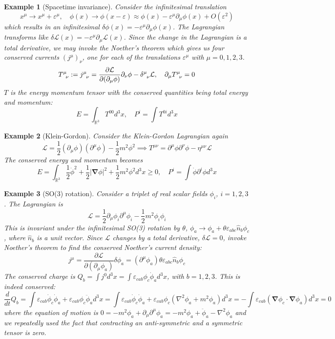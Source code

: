 \documentclass[a4paper]{article}
\newtheorem{eg}{Example}[section]
\theoremstyle{new}
\begin{document}
\begin{eg}[Spacetime invariance]
Consider the infinitesimal translation
$$x^\mu\rightarrow x^\mu+\varepsilon^\mu,\quad\phi(x)\rightarrow\phi(x-\varepsilon)\approx\phi(x)-\varepsilon^\mu\partial_\mu\phi(x)+O(\varepsilon^2)$$
which results in an infinitesimal $\delta\phi(x)=-\varepsilon^\mu\partial_\mu\phi(x)$. The Lagrangian transforms like $\delta\mathcal{L}(x)=-\varepsilon^\mu\partial_\mu\mathcal{L}(x)$. Since the change in the Lagrangian is a total derivative, we may invoke the Noether’s theorem which gives us four conserved currents $(j^\mu)_\nu$, one for each of the translations $\varepsilon^\mu$ with $\mu=0,1,2,3$.
$$\tensor*{T}{*_{}^{\mu}_{\nu}}:=\tensor*{j}{*_{}^{\mu}_{\nu}}=\frac{\partial\mathcal{L}}{\partial(\partial_\mu\phi)}\partial_\nu\phi-\tensor*{\delta}{*_{}^{\mu}_{\nu}}\mathcal{L},\quad\partial_\mu\tensor*{T}{*_{}^{\mu}_{\nu}}=0$$
$T$ is the energy momentum tensor with the conserved quantities being total energy and momentum:
$$E=\int_{\mathbb{R}^3}T^{00}d^3x,\quad P^i=\int T^{0i}d^3x$$
\end{eg}
\begin{eg}[Klein-Gordon]
Consider the Klein-Gordon Lagrangian again
$$\mathcal{L}=\frac{1}{2}(\partial_\mu\phi)(\partial^\mu\phi)-\frac{1}{2}m^2\phi^2\implies T^{\mu\nu}=\partial^\mu\phi\partial^\nu\phi-\eta^{\mu\nu}\mathcal{L}$$
The conserved energy and momentum becomes
$$E=\int_{\mathbb{R}^3}\frac{1}{2}\dot{\phi}^2+\frac{1}{2}|\boldsymbol{\nabla}\phi|^2+\frac{1}{2}m^2\phi^2d^3x\geq0,\quad P^i=\int\dot{\phi}\partial^i\phi d^3x$$
\end{eg}
\begin{eg}[SO(3) rotation]
Consider a triplet of real scalar fields $\phi_i$, $i=1,2,3$. The Lagrangian is
$$\mathcal{L}=\frac{1}{2}\partial_\mu\phi_i\partial^\mu\phi_i-\frac{1}{2}m^2\phi_i\phi_i$$
This is invariant under the infinitesimal SO(3) rotation by $\theta$, $\phi_a\rightarrow\phi_a+\theta\varepsilon_{abc}\hat{n}_b\phi_c$, where $\hat{n}_b$ is a unit vector. Since $\mathcal{L}$ changes by a total derivative, $\delta\mathcal{L}=0$, invoke Noether's theorem to find the conserved Noether's current density:
$$j^\mu=\frac{\partial\mathcal{L}}{\partial(\partial_\mu\phi_a)}\delta\phi_a=(\partial^\mu\phi_a)\theta\varepsilon_{abc}\hat{n}_b\phi_c$$
The conserved charge is $Q_b=\int j^0d^3x=\int\varepsilon_{cab}\phi_c\dot{\phi}_ad^3x$, with $b=1,2,3$. This is indeed conserved:
$$\frac{d}{dt}Q_b=\int\varepsilon_{cab}\dot{\phi}_c\dot{\phi}_a+\varepsilon_{cab}\phi_c\ddot{\phi}_ad^3x=\int\varepsilon_{cab}\dot{\phi}_c\dot{\phi}_a+\varepsilon_{cab}\phi_c(\nabla^2\phi_a+m^2\phi_a)d^3x=-\int\varepsilon_{cab}(\boldsymbol{\nabla}\phi_c\cdot\boldsymbol{\nabla}\phi_a)d^3x=0$$
where the equation of motion is $0=-m^2\phi_a+\partial_\mu\partial^\mu\phi_a=-m^2\phi_a+\ddot{\phi}_a-\nabla^2\phi_a$ and we repeatedly used the fact that contracting an anti-symmetric and a symmetric tensor is zero.
\end{eg}
\end{document}
